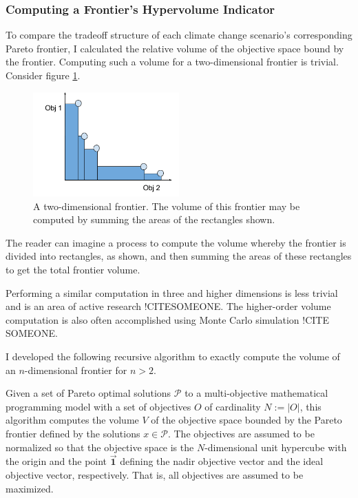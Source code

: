 \subsubsection{Computing a Frontier's Hypervolume Indicator}
To compare the tradeoff structure of each climate change scenario's corresponding Pareto frontier, I calculated the relative volume of the objective space bound by the frontier.  Computing such a volume for a two-dimensional frontier is trivial. Consider figure \ref{fig:2DFrontierVol}.
\begin{figure}[h]
  \centering
    \includegraphics[width=0.5\textwidth]{"../images/2DFrontierVolumeExample"}
  \caption{A two-dimensional frontier. The volume of this frontier may be computed by summing the areas of the rectangles shown.}
  \label{fig:2DFrontierVol}
\end{figure}
The reader can imagine a process to compute the volume whereby the frontier is divided into rectangles, as shown, and then summing the areas of these rectangles to get the total frontier volume.

Performing a similar computation in three and higher dimensions is less trivial and is an area of active research !CITESOMEONE. The higher-order volume computation is also often accomplished using Monte Carlo simulation !CITE SOMEONE.

I developed the following recursive algorithm to exactly compute the volume of an $n$-dimensional frontier for $n>2$.

Given a set of Pareto optimal solutions $\mathcal{P}$ to a multi-objective mathematical programming model with a set of objectives $O$ of cardinality $N := |O|$, this algorithm computes the volume $V$ of the objective space bounded by the Pareto frontier defined by the solutions $x \in \mathcal{P}$. The objectives are assumed to be normalized so that the objective space is the $N$-dimensional unit hypercube with the origin and the point $\vec{\mathbf{1}}$ defining the nadir objective vector and the ideal objective vector, respectively. That is, all objectives are assumed to be maximized.

